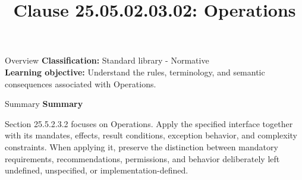 \documentclass[10pt,letterpaper]{article}
\title{Clause 25.05.02.03.02: Operations}
\author{}
\date{}
\begin{document}
\maketitle
\begin{CornellOverviewBox}{Overview}
\textbf{Classification:} Standard library - Normative\\[2pt]
\textbf{Learning objective:} Understand the rules, terminology, and semantic consequences associated with Operations.
\end{CornellOverviewBox}\begin{CornellSummaryBox}{Summary}
{\sffamily\bfseries\color{Accent} Summary}\par\vspace{3pt}Section 25.5.2.3.2 focuses on Operations. Apply the specified interface together with its mandates, effects, result conditions, exception behavior, and complexity constraints. When applying it, preserve the distinction between mandatory requirements, recommendations, permissions, and behavior deliberately left undefined, unspecified, or implementation-defined.
\end{CornellSummaryBox}
\end{document}
